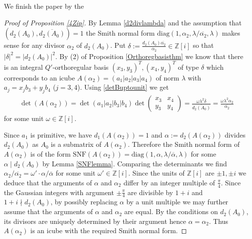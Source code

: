\documentclass[11pt]{amsart}
\newcommand{\diag}{\mathrm{diag}}
\newcommand{\SNF}{\mathrm{SNF}}
\newcommand{\ZZ}{\mathbb{Z}}
\theoremstyle{definition}
\theoremstyle{remark}
\begin{document}
We finish the paper by the
\begin{proof}[Proof of Proposition \ref{4Zip}]
By Lemma \ref{d2divlambda} and the assumption that $(d_2(A_0),\overline{d_2(A_0)})=1$ the Smith normal form $\diag(1,\alpha_2,\lambda/\overline{\alpha_2},\lambda)$ makes sense for any divisor $\alpha_2$ of $d_2(A_0)$. Put $\delta:=\frac{d_2(A_0)\overline{\alpha_2}}{\alpha_2}\in \ZZ[i]$ so that $|\delta|^2=|d_2(A_0)|^2$. By (2) of Proposition \ref{Orthoregbasisthm} we know that there is an integral $Q'$-orthoregular basis $(x_3,y_3)^T, (x_4,y_4)^T$ of type $\delta$ which corresponds to an icube $A(\alpha_2)=(a_1|a_2|a_3|a_4)$ of norm $\lambda$ with $a_j=x_jb_3+y_jb_4$ ($j=3,4$). Using \eqref{detBuptounit} we get
\begin{align*}
\det(A(\alpha_2))=\det(a_1|a_2|b_3|b_4)\det \begin{pmatrix}x_3 & x_4 \\ y_3 & y_4\end{pmatrix}=\frac{\omega\lambda^2\overline\delta}{\overline{d_2(A_0)}}=\frac{\omega\lambda^2\alpha_2}{\overline{\alpha_2}}
\end{align*}
for some unit $\omega\in \ZZ[i]$.

Since $a_1$ is primitive, we have $d_1(A(\alpha_2))=1$ and $\alpha:=d_2(A(\alpha_2))$ divides $d_2(A_0)$ as $A_0$ is a submatrix of $A(\alpha_2)$. Therefore the Smith normal form of $A(\alpha_2)$ is of the form $\SNF(A(\alpha_2))=\diag(1,\alpha,\lambda/\overline\alpha,\lambda)$ for some $\alpha\mid d_2(A_0)$ by Lemma \ref{SNFlemma}. Comparing the determinants we find $
\alpha_2/\overline{\alpha_2}=\omega'\cdot\alpha/\overline{\alpha}
$ for some unit $\omega'\in \ZZ[i]$. Since the units of $\ZZ[i]$ are $\pm1,\pm i$ we deduce that the arguments of $\alpha$ and $\alpha_2$ differ by an integer multiple of $\frac{\pi}{4}$. Since the Gaussian integers with argument $\pm\frac{\pi}{4}$ are divisible by $1+i$ and $1+i\nmid d_2(A_0)$, by possibly replacing $\alpha$ by a unit multiple we may further assume that the arguments of $\alpha$ and $\alpha_2$ are equal. By the conditions on $d_2(A_0)$, its divisors are uniquely determined by their argument hence $\alpha=\alpha_2$. Thus $A(\alpha_2)$ is an icube with the required Smith normal form.
\end{proof}



\end{document}
